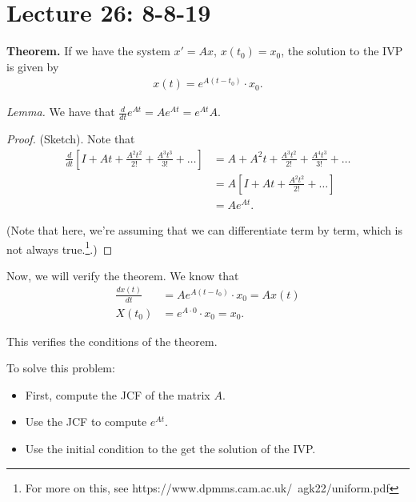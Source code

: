 \documentclass{article}
\begin{document}
\section{Lecture 26: 8-8-19}

{\bf Theorem.} If we have the system $x' = A x$, $x(t_0) = x_0$, the solution to the IVP is given by
\begin{align*}
  x(t) = e^{A(t - t_0)} \cdot x_0.
\end{align*}

{\it Lemma.} We have that $\frac{d}{dt} e^{At} = A e^{At} = e^{At} A$.

\begin{proof} (Sketch).  Note that
\begin{align*}
  \frac{d}{dt} \left[ I + At + \frac{A^2 t^2}{2!} + \frac{A^3 t^3}{3!} + \dots \right] &= A + A^2 t + \frac{A^3 t^2}{2!} + \frac{A^4 t^3}{3!} + \dots \\
  &= A \left[ I + A t + \frac{A^2 t^2}{2!} + \dots \right] \\
  &= A e^{At}.
\end{align*}

(Note that here, we're assuming that we can differentiate term by term, which is not always true.\footnote{For more on this, see https://www.dpmms.cam.ac.uk/~agk22/uniform.pdf}.)
\end{proof}

Now, we will verify the theorem.  We know that
\begin{align*}
  \frac{d x(t)}{d t} &= A e^{A (t - t_0)} \cdot x_0 = A x(t) \\
  X(t_0) &= e^{A \cdot 0} \cdot x_0 = x_0.
\end{align*}

This verifies the conditions of the theorem.

To solve this problem:
\begin{itemize}
  \item First, compute the JCF of the matrix $A$.
  \item Use the JCF to compute $e^{At}$.
  \item Use the initial condition to the get the solution of the IVP.
\end{itemize}
\end{document}
